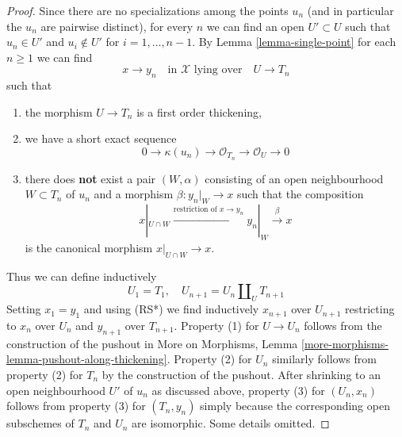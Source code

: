 \documentclass[10pt,a4paper]{amsart}
\theoremstyle{plain}
\theoremstyle{definition}
\theoremstyle{remark}
\numberwithin{equation}{subsection}
\begin{document}
\begin{proof}
Since there are no specializations among the points $u_n$ (and in
particular the $u_n$ are pairwise distinct), for every $n$
we can find an open $U' \subset U$
such that $u_n \in U'$ and $u_i \not \in U'$ for $i = 1, \ldots, n - 1$.
By Lemma \ref{lemma-single-point} for each $n \geq 1$ we can find
$$
x \to y_n
\quad\text{in }\mathcal{X}\text{ lying over}\quad
U \to T_n
$$
such that
\begin{enumerate}
\item the morphism $U \to T_n$ is a first order thickening,
\item we have a short exact sequence
$$
0 \to \kappa(u_n) \to \mathcal{O}_{T_n} \to \mathcal{O}_U \to 0
$$
\item there does {\bf not} exist a pair $(W, \alpha)$
consisting of an open neighbourhood $W \subset T_n$ of $u_n$
and a morphism $\beta : y_n|_W \to x$ such that the composition
$$
x|_{U \cap W} \xrightarrow{\text{restriction of }x \to y_n}
y_n|_W \xrightarrow{\beta} x
$$
is the canonical morphism $x|_{U \cap W} \to x$.
\end{enumerate}
Thus we can define inductively
$$
U_1 = T_1, \quad
U_{n + 1} = U_n \amalg_U T_{n + 1}
$$
Setting $x_1 = y_1$ and using (RS*) we find inductively
$x_{n + 1}$ over $U_{n + 1}$ restricting to
$x_n$ over $U_n$ and $y_{n + 1}$ over $T_{n + 1}$.
Property (1) for $U \to U_n$ follows from the construction
of the pushout in More on Morphisms, Lemma
\ref{more-morphisms-lemma-pushout-along-thickening}.
Property (2) for $U_n$ similarly follows from
property (2) for $T_n$ by the construction of the pushout.
After shrinking to an open neighbourhood $U'$ of $u_n$
as discussed above, property (3) for $(U_n, x_n)$ follows from property (3)
for $(T_n, y_n)$ simply because the corresponding open subschemes
of $T_n$ and $U_n$ are isomorphic. Some details omitted.
\end{proof}
\end{document}
